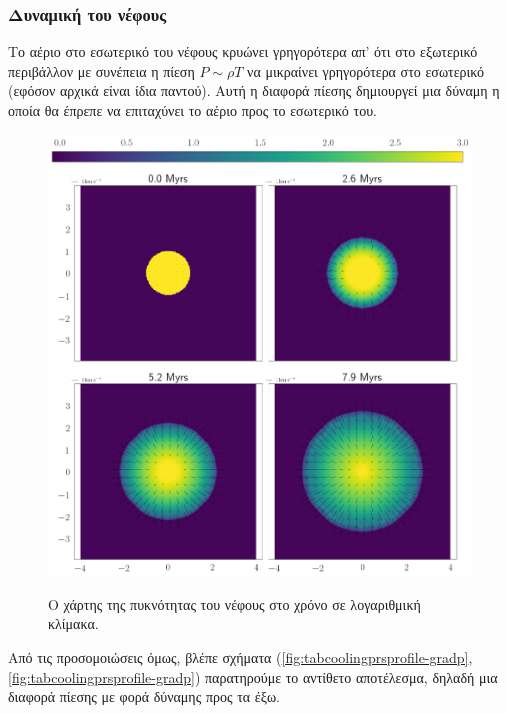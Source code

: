 	\subsubsection{Δυναμική του νέφους}
	
	Το αέριο στο εσωτερικό του νέφους κρυώνει γρηγορότερα απ' ότι στο εξωτερικό περιβάλλον με συνέπεια η πίεση $P \sim \rho T$ να μικραίνει γρηγορότερα στο εσωτερικό (εφόσον αρχικά είναι ίδια παντού). Αυτή η διαφορά πίεσης δημιουργεί μια  δύναμη η οποία θα έπρεπε να επιταχύνει το αέριο προς το εσωτερικό του. 
	
	\begin{figure}[h]
		\centering
		\caption{Ο χάρτης της πυκνότητας του νέφους στο χρόνο σε λογαριθμική κλίμακα.}
		\includegraphics[width=1.0\linewidth]{DataImages/TabCoolingRHOquad}
		\label{fig:TabCoolingRHOquad}
	\end{figure}
	
	Από τις προσομοιώσεις όμως, βλέπε σχήματα (\ref{fig:tabcoolingprsprofile-gradp},\ref{fig:tabcoolingprsprofile-gradp}) παρατηρούμε το αντίθετο αποτέλεσμα, δηλαδή μια διαφορά πίεσης με φορά δύναμης προς τα έξω. 


